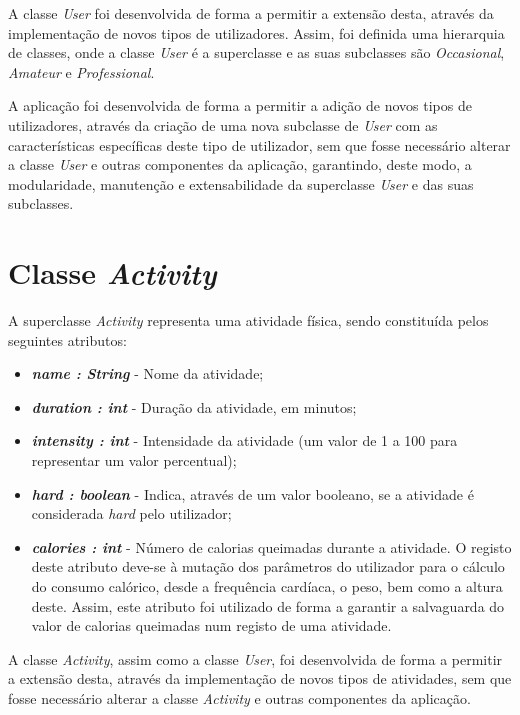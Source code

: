 \documentclass[a4paper,12pt]{scrreprt}
\begin{document}
    A classe \textit{User} foi desenvolvida de forma a permitir a extensão desta, através da implementação de novos tipos de utilizadores.
    Assim, foi definida uma hierarquia de classes, onde a classe \textit{User} é a superclasse e as suas subclasses são \textit{Occasional}, \textit{Amateur} e \textit{Professional}.

    A aplicação foi desenvolvida de forma a permitir a adição de novos tipos de utilizadores,
    através da criação de uma nova subclasse de \textit{User} com as características específicas deste tipo de utilizador,
    sem que fosse necessário alterar a classe \textit{User} e outras componentes da aplicação,
    garantindo, deste modo, a modularidade, manutenção e extensabilidade da superclasse \textit{User} e das suas subclasses.

\clearpage
\section{Classe \textit{Activity}}
    A superclasse \textit{Activity} representa uma atividade física, sendo constituída pelos seguintes atributos:

    \begin{itemize}
        \item \textit{\textbf{name : String}} - Nome da atividade;
        \item \textit{\textbf{duration : int}} - Duração da atividade, em minutos;
        \item \textit{\textbf{intensity : int}} - Intensidade da atividade (um valor de 1 a 100 para representar um valor percentual);
        \item \textit{\textbf{hard : boolean}} - Indica, através de um valor booleano, se a atividade é considerada \textit{hard} pelo utilizador;
        \item \textit{\textbf{calories : int}} - Número de calorias queimadas durante a atividade. O registo deste atributo deve-se à mutação dos parâmetros do utilizador para o cálculo do consumo calórico, desde a frequência cardíaca, o peso, bem como a altura deste. Assim, este atributo foi utilizado de forma a garantir a salvaguarda do valor de calorias queimadas num registo de uma atividade.
    \end{itemize}

    A classe \textit{Activity}, assim como a classe \textit{User}, foi desenvolvida de forma a permitir a extensão desta,
    através da implementação de novos tipos de atividades, sem que fosse necessário alterar a classe \textit{Activity} e
    outras componentes da aplicação.
\end{document}
